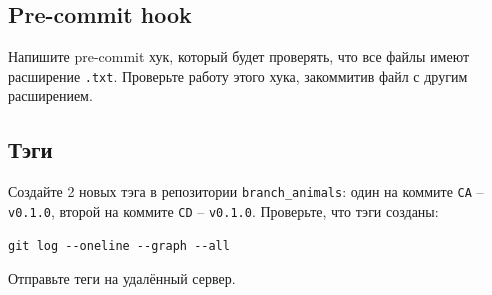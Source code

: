 \documentclass{article}
\begin{document}
\subsection{Pre-commit hook}
Напишите pre-commit хук, который будет проверять, что все файлы имеют расширение \texttt{.txt}. Проверьте работу этого хука, закоммитив файл с другим расширением.


\subsection{Тэги}
Создайте 2 новых тэга в репозитории \texttt{branch\_animals}: один на коммите \texttt{CA} -- \texttt{v0.1.0}, второй на коммите \texttt{CD} -- \texttt{v0.1.0}. Проверьте, что тэги созданы:
\begin{lstlisting}
git log --oneline --graph --all
\end{lstlisting}
Отправьте теги на удалённый сервер.
\end{document}
